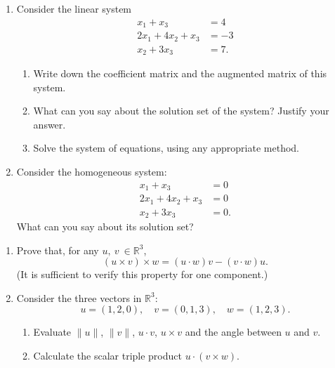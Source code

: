 \documentclass[12pt,a4paper]{article}
\begin{document}
	\begin{enumerate}
		\item Consider the linear system
		\begin{align*}
		x_1 + x_3 &= 4\\
		2x_1 + 4x_2 + x_3 &= -3\\
		x_2 + 3x_3 &= 7.
		\end{align*}
		\begin{enumerate}
			\item Write down the coefficient matrix and the augmented matrix of this system. 
			
			\item What can you say about the solution set of the system? Justify your answer. 
			
			\item Solve the system of equations, using any appropriate method. 
		\end{enumerate}
		\item Consider the homogeneous system:
		\begin{align*}
		x_1 + x_3 &= 0\\
		2x_1 + 4x_2 + x_3 &= 0\\
		x_2 + 3x_3 &= 0.
		\end{align*}
		What can you say about its solution set?
	\end{enumerate}
	\vfill
	\item %
	\begin{enumerate}
		\item Prove that, for any $u,\:v\:\in\mathbb{R}^3$, 
		$$(u\times v)\times w= (u\cdot w)v - (v\cdot w)u.$$
		(It is sufficient to verify this property for one component.)
		\item\vfill
		Consider the three vectors in $\mathbb{R}^3$:
		$$
		u = (1, 2, 0), \quad v = (0, 1, 3),\quad w = (1, 2, 3).
		$$
		\begin{enumerate}
			\item  Evaluate $\|u\|$, $\|v\|$, $u\cdot v$, $u\times v$ and the angle between $u$ and $v$. 
			
			\medskip\item Calculate the scalar triple product  $u\cdot(v \times w)$.
		\end{enumerate}
	\end{enumerate}
	
\end{document}
